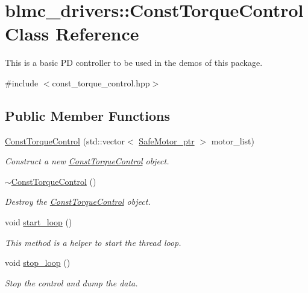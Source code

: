 \hypertarget{classblmc__drivers_1_1ConstTorqueControl}{}\section{blmc\+\_\+drivers\+:\+:Const\+Torque\+Control Class Reference}
\label{classblmc__drivers_1_1ConstTorqueControl}


This is a basic PD controller to be used in the demos of this package.  




{\ttfamily \#include $<$const\+\_\+torque\+\_\+control.\+hpp$>$}

\subsection*{Public Member Functions}
\begin{DoxyCompactItemize}
\item 
\hyperlink{classblmc__drivers_1_1ConstTorqueControl_a2253fc0273462fa35c21f1424dcc919c}{Const\+Torque\+Control} (std\+::vector$<$ \hyperlink{namespaceblmc__drivers_ab975c3be3c53a93a10c491f07a132e2b}{Safe\+Motor\+\_\+ptr} $>$ motor\+\_\+list)
\begin{DoxyCompactList}\small\item\em Construct a new \hyperlink{classblmc__drivers_1_1ConstTorqueControl}{Const\+Torque\+Control} object. \end{DoxyCompactList}\item 
\mbox{\label{classblmc__drivers_1_1ConstTorqueControl_a19dab80ddeb10158d1ad17cdcfd0cc47}} 
\hyperlink{classblmc__drivers_1_1ConstTorqueControl_a19dab80ddeb10158d1ad17cdcfd0cc47}{$\sim$\+Const\+Torque\+Control} ()
\begin{DoxyCompactList}\small\item\em Destroy the \hyperlink{classblmc__drivers_1_1ConstTorqueControl}{Const\+Torque\+Control} object. \end{DoxyCompactList}\item 
\mbox{\label{classblmc__drivers_1_1ConstTorqueControl_aa5e7bae477c05904c00f4e843d635c14}} 
void \hyperlink{classblmc__drivers_1_1ConstTorqueControl_aa5e7bae477c05904c00f4e843d635c14}{start\+\_\+loop} ()
\begin{DoxyCompactList}\small\item\em This method is a helper to start the thread loop. \end{DoxyCompactList}\item 
\mbox{\label{classblmc__drivers_1_1ConstTorqueControl_aeb954986cb31a9cb0796f6bee9b22b1a}} 
void \hyperlink{classblmc__drivers_1_1ConstTorqueControl_aeb954986cb31a9cb0796f6bee9b22b1a}{stop\+\_\+loop} ()
\begin{DoxyCompactList}\small\item\em Stop the control and dump the data. \end{DoxyCompactList}\end{DoxyCompactItemize}
